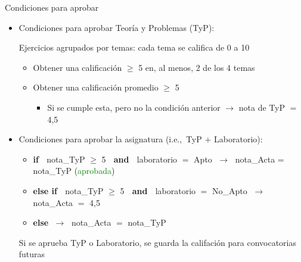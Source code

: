 \documentclass[aspectratio=169, usenames,svgnames,dvipsnames]{beamer}
\begin{document}
\begin{frame}{Condiciones para aprobar}
    \begin{itemize}
    \item \alert{Condiciones para aprobar Teoría y Problemas}  (TyP):

    \vspace{1mm}
    Ejercicios agrupados por temas: cada tema se califica de 0 a 10
        \vspace{1mm}
        \begin{itemize}
        \item {\normalsize Obtener una calificación $\geq$ 5 en, al menos, 2 de los 4 temas}
        \vspace{1mm}
        \item {\normalsize Obtener una calificación promedio $\geq$ 5} 
            \vspace{1mm}
            \begin{itemize}
            \item {\normalsize Si se cumple esta, pero no la condición anterior $\rightarrow$ nota de TyP $=$ 4,5}
            \end{itemize}
        \end{itemize}
    \vspace{3mm}
    \item \alert{Condiciones para aprobar la asignatura} (i.e.,~TyP $+$ Laboratorio):
        \vspace{1mm}
        \begin{itemize}
        \item {\normalsize \textbf{if} $\;$ nota\_TyP $\geq$ 5 $\;$ \textbf{and} $\;$ laboratorio $=$ Apto $\; \rightarrow \;$ nota\_Acta = nota\_TyP} (\textcolor{green}{aprobada})
        
        \vspace{1mm}
        \item {\normalsize \textbf{else if} $\;$ nota\_TyP $\geq$ 5 $\;$ \textbf{and} $\;$ laboratorio $=$ No\_Apto $\; \rightarrow \;$ nota\_Acta $=$ 4,5}
        \vspace{1mm}
        \item {\normalsize \textbf{else} $\; \rightarrow \;$ nota\_Acta $=$ nota\_TyP}
        \end{itemize}
    \vspace{6mm}
    Si se aprueba TyP o Laboratorio, \alert{se guarda la califación} para convocatorias futuras
    \end{itemize}

\end{frame}
\end{document}

